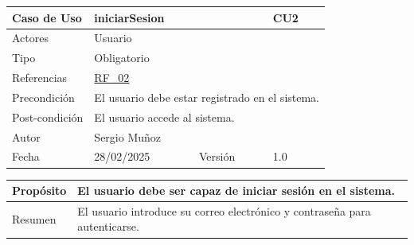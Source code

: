 \begin{table}[H]
    \centering
    \begin{tabular}{| m{} | m{} | m{} | m{} |}
        \hline
        \rowcolor[HTML]{C0C0C0} Caso de Uso & \multicolumn{2}{|m{0.43\textwidth}|}{iniciarSesion} &  CU2\\ 
        \hline
        Actores & \multicolumn{3}{l|}{Usuario} \\ 
        \hline
        Tipo & \multicolumn{3}{l|}{Obligatorio} \\ 
        \hline
        Referencias & \multicolumn{3}{l|}{\hyperref[req:RF02]{RF\_02}} \\ 
        \hline
        Precondición & \multicolumn{3}{l|}{El usuario debe estar registrado en el sistema.} \\ 
        \hline
        Post-condición & \multicolumn{3}{l|}{El usuario accede al sistema.} \\ 
        \hline
        Autor & \multicolumn{3}{l|}{Sergio Muñoz} \\ 
        \hline
        Fecha & 28/02/2025 & Versión & 1.0 \\
        \hline
    \end{tabular}
\end{table}

\begin{table}[H]
    \centering
    \begin{tabular}{| m{} | m{} | m{} | m{} |}
        \hline
        Propósito & \multicolumn{3}{m{0.67\textwidth}|}{El usuario debe ser capaz de iniciar sesión en el sistema.}   \\ 
        \hline
        Resumen & \multicolumn{3}{m{0.67\textwidth}|}{El usuario introduce su correo electrónico y contraseña para autenticarse.} \\ 
        \hline
    \end{tabular}
\end{table}



